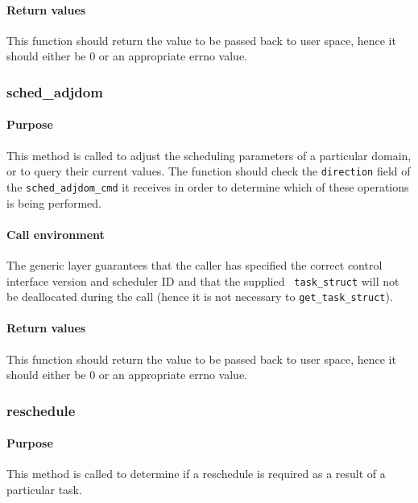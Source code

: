 \documentclass[11pt,twoside,final,openright]{xenstyle}
\begin{document}
\paragraph*{Return values}

This function should return the value to be passed back to user space, hence it
should either be 0 or an appropriate errno value.

\subsubsection{sched\_adjdom}

\paragraph*{Purpose}

This method is called to adjust the scheduling parameters of a particular
domain, or to query their current values.  The function should check
the {\tt direction} field of the {\tt sched\_adjdom\_cmd} it receives in
order to determine which of these operations is being performed.

\paragraph*{Call environment}

The generic layer guarantees that the caller has specified the correct
control interface version and scheduler ID and that the supplied {\tt
task\_struct} will not be deallocated during the call (hence it is not
necessary to {\tt get\_task\_struct}).

\paragraph*{Return values}

This function should return the value to be passed back to user space, hence it
should either be 0 or an appropriate errno value.

\subsubsection{reschedule}

\paragraph*{Purpose}

This method is called to determine if a reschedule is required as a result of a
particular task.
\end{document}

